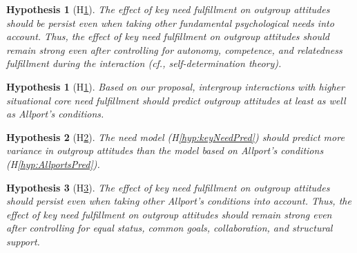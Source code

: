 \documentclass[man, 12pt, a4paper]{apa7}
\theoremstyle{break}
\theoremstyle{plain}
\newtheorem{hyp}{Hypothesis}
\newtheorem{subhyp}{Hypothesis}
\begin{document}
\begin{subhyp}[H\ref{hyp:keyNeedSDT}] \label{hyp:keyNeedSDT}
\addtolength{\leftskip}{2.5em}
The effect of key need fulfillment on outgroup attitudes should be persist even when taking other fundamental psychological needs into account. Thus, the effect of key need fulfillment on outgroup attitudes should remain strong even after controlling for autonomy, competence, and relatedness fulfillment during the interaction (cf., self-determination theory). 
\end{subhyp}

\begin{hyp}[H\ref{hyp:comparison}] \label{hyp:comparison}
Based on our proposal, intergroup interactions with higher situational core need fulfillment should predict outgroup attitudes at least as well as Allport's conditions.
\end{hyp}

\setcounter{subhyp}{0}
\begin{subhyp}[H\ref{hyp:compModel}] \label{hyp:compModel}
\addtolength{\leftskip}{2.5em}
The need model (H\ref{hyp:keyNeedPred}) should predict more variance in outgroup attitudes than the model based on Allport's conditions (H\ref{hyp:AllportsPred}).
\end{subhyp}

\begin{subhyp}[H\ref{hyp:compTogether}] \label{hyp:compTogether}
\addtolength{\leftskip}{2.5em}
The  effect of key need fulfillment on outgroup attitudes should  persist even when taking other Allport's conditions into account. Thus, the effect of key need fulfillment on outgroup attitudes should remain strong even after controlling for equal status, common goals, collaboration, and structural support.  
\end{subhyp}
\end{document}
